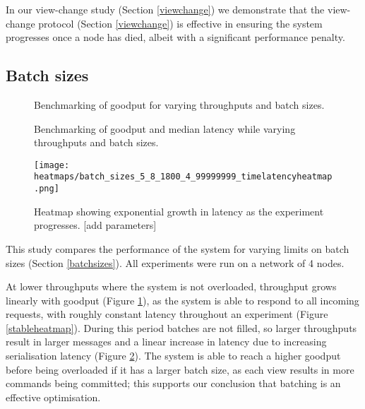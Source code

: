 In our view-change study (Section \ref{viewchange}) we demonstrate that the view-change protocol (Section \ref{viewchange}) is effective in ensuring the system progresses once a node has died, albeit with a significant performance penalty.

\subsection{Batch sizes} \label{batchsizeseval}

\begin{figure}[h!]
\centering

\caption{Benchmarking of goodput for varying throughputs and batch sizes.}
\label{throughputgoodputbatch}
\end{figure}

\begin{figure}[h!]
\centering

\caption{Benchmarking of goodput and median latency while varying throughputs and batch sizes.}
\label{goodputlatencybatch}
\end{figure}

% 

\begin{figure}[h!]
\centering
\texttt{[image: heatmaps/batch\_sizes\_5\_8\_1800\_4\_99999999\_timelatencyheatmap.png]}
\caption{Heatmap showing exponential growth in latency as the experiment progresses. [add parameters]}
\label{expheatmap}
\end{figure}

This study compares the performance of the system for varying limits on batch sizes (Section \ref{batchsizes}). All experiments were run on a network of 4 nodes.

At lower throughputs where the system is not overloaded, throughput grows linearly with goodput (Figure \ref{throughputgoodputbatch}), as the system is able to respond to all incoming requests, with roughly constant latency throughout an experiment (Figure \ref{stableheatmap}). During this period batches are not filled, so larger throughputs result in larger messages and a linear increase in latency due to increasing serialisation latency (Figure \ref{goodputlatencybatch}). The system is able to reach a higher goodput before being overloaded if it has a larger batch size, as each view results in more commands being committed; this supports our conclusion that batching is an effective optimisation.


